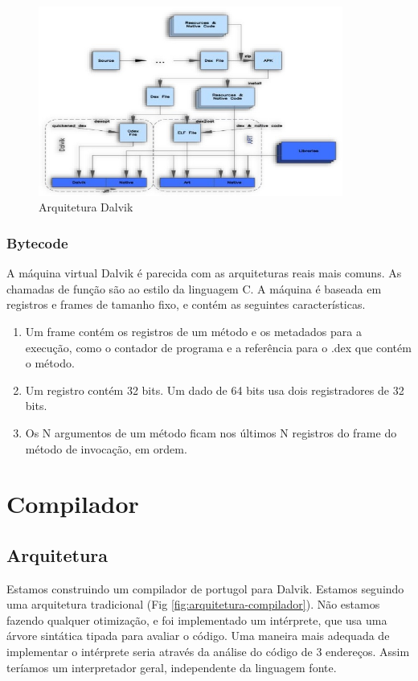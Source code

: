 \documentclass[12pt,a4paper,twoside]{report}
\begin{document}
\begin{figure}[h]
	\centering
	\includegraphics[width=10cm]{imagens/arquitetura-dalvik}
	\caption{Arquitetura Dalvik}
	\label{fig:arquitetura-dalvik}
\end{figure}

\subsection{Bytecode}
A máquina virtual Dalvik é parecida com as arquiteturas reais mais comuns. As chamadas de função são ao estilo da linguagem C.  A máquina é baseada em registros e frames de tamanho fixo, e contém as seguintes
características.

\begin{enumerate}
	\item Um frame contém os registros de um método e os metadados para a execução, como o contador de programa e a referência para o .dex que contém o método.
	\item Um registro contém 32 bits. Um dado de 64 bits usa dois registradores de 32 bits.
	\item Os N argumentos de um método ficam nos últimos N registros do frame do método de invocação, em ordem.
\end{enumerate}

\chapter{Compilador}

\section{Arquitetura}
Estamos construindo um compilador de portugol para Dalvik. Estamos seguindo uma arquitetura
tradicional (Fig \ref{fig:arquitetura-compilador}). Não estamos fazendo qualquer otimização, e foi
implementado um intérprete, que usa uma árvore sintática tipada para avaliar o código.
Uma maneira mais adequada de implementar o intérprete seria através da análise do código de 3 endereços. Assim teríamos
um interpretador geral, independente da linguagem fonte.
\end{document}
